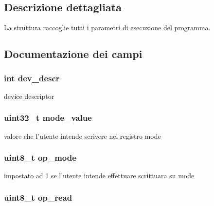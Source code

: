 \subsection{Descrizione dettagliata}
La struttura raccoglie tutti i parametri di esecuzione del programma. 

\subsection{Documentazione dei campi}
\hypertarget{structparam__t_a52701f5f8091598d5c5ac1bb80cd2070}{
\subsubsection[{dev\+\_\+descr}]{\setlength{\rightskip}{0pt plus 5cm}int dev\+\_\+descr}}\label{structparam__t_a52701f5f8091598d5c5ac1bb80cd2070}


device descriptor 

\hypertarget{structparam__t_a007b34e09ccda08824bc74ab9d86c5a8}{
\subsubsection[{mode\+\_\+value}]{\setlength{\rightskip}{0pt plus 5cm}uint32\+\_\+t mode\+\_\+value}}\label{structparam__t_a007b34e09ccda08824bc74ab9d86c5a8}


valore che l'utente intende scrivere nel registro mode 

\hypertarget{structparam__t_aec948fb30e99b1eda7e3d9ff741d417a}{
\subsubsection[{op\+\_\+mode}]{\setlength{\rightskip}{0pt plus 5cm}uint8\+\_\+t op\+\_\+mode}}\label{structparam__t_aec948fb30e99b1eda7e3d9ff741d417a}


impostato ad 1 se l'utente intende effettuare scrittuara su mode 

\hypertarget{structparam__t_ae66d5c3154a115636a63227b7489a6eb}{
\subsubsection[{op\+\_\+read}]{\setlength{\rightskip}{0pt plus 5cm}uint8\+\_\+t op\+\_\+read}}\label{structparam__t_ae66d5c3154a115636a63227b7489a6eb}


